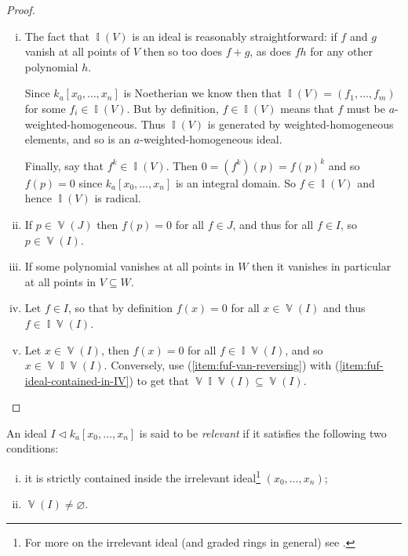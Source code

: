 \documentclass[10pt,notitlepage]{article}
\numberwithin{equation}{subsection}
\DeclareMathOperator{\van}{\mathbb{V}}
\DeclareMathOperator{\ide}{\mathbb{I}}
\newcommand{\kazn}{k_a[x_0,\ldots,x_n]}
\begin{document}
    \begin{proof}
        \begin{enumerate}[(i)]
            \item The fact that $\ide(V)$ is an ideal is reasonably straightforward: if $f$ and $g$ vanish at all points of $V$ then so too does $f+g$, as does $fh$ for any other polynomial $h$.

            Since $\kazn$ is Noetherian we know then that $\ide(V)=(f_1,\ldots,f_m)$ for some $f_i\in\ide(V)$.
            But by definition, $f\in\ide(V)$ means that $f$ must be $a$-weighted-homogeneous.
            Thus $\ide(V)$ is generated by weighted-homogeneous elements, and so is an $a$-weighted-homogeneous ideal.

            Finally, say that $f^k\in\ide(V)$.
            Then $0=(f^k)(p)=f(p)^k$ and so $f(p)=0$ since $\kazn$ is an integral domain.
            So $f\in\ide(V)$ and hence $\ide(V)$ is radical.
            \item\label{item:fuf-van-reversing} If $p\in\van(J)$ then $f(p)=0$ for all $f\in J$, and thus for all $f\in I$, so $p\in\van(I)$.
            \item\label{item:fuf-ide-reversing} If some polynomial vanishes at all points in $W$ then it vanishes in particular at all points in $V\subseteq W$.
            \item\label{item:fuf-ideal-contained-in-IV} Let $f\in I$, so that by definition $f(x)=0$ for all $x\in\van(I)$ and thus \mbox{$f\in\ide\van(I)$}.
            \item Let $x\in\van(I)$, then $f(x)=0$ for all $f\in\ide\van(I)$, and so $x\in\van\ide\van(I)$.
            Conversely, use (\ref{item:fuf-van-reversing}) with (\ref{item:fuf-ideal-contained-in-IV}) to get that $\van\ide\van(I)\subseteq\van(I)$.\qedhere
        \end{enumerate}
    \end{proof}

    \begin{definition}\label{defn:relevant-ideals}
        An ideal $I\triangleleft\kazn$ is said to be \emph{relevant} if it satisfies the following two conditions:
        \begin{enumerate}[(i)]
            \item it is strictly contained inside the irrelevant ideal\footnote{%
                For more on the irrelevant ideal (and graded rings in general) see \cite[Chapter~6]{Agrawal:uf}.
            } $(x_0,\ldots,x_n)$;
            \item $\van(I)\neq\varnothing$.\qedhere
        \end{enumerate}
    \end{definition}
\end{document}
